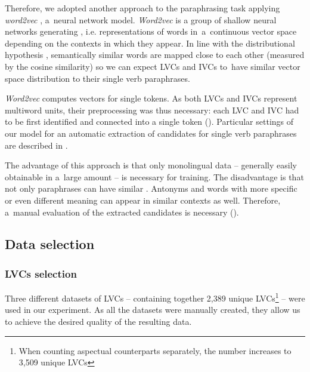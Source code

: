 \documentclass[output=paper,modfonts,nonflat]{langsci/langscibook}
\begin{document}

Therefore, we adopted another approach to the paraphrasing task applying 
\emph{word2vec} \citep{mikolov2013}, a~neural network model. \emph{Word2vec} 
is a group of shallow neural networks generating , i.e. 
representations  of words in~a~continuous vector space depending on the 
contexts in which they appear. In line with the distributional hypothesis 
\citep{harris54}, semantically similar words are mapped close to each other 
(measured by the  cosine similarity) so we can expect LVCs and IVCs to~have 
similar vector space distribution to their single verb paraphrases. 

\emph{Word2vec} computes vectors for single tokens. As both LVCs and IVCs 
represent multiword units, their preprocessing was thus necessary: each LVC 
and IVC had to be first identified and connected into a single token 
(). Particular settings of our model for an automatic 
extraction of candidates for single verb paraphrases are described in 
.

The advantage of this approach is that only monolingual data -- generally 
easily obtainable in a~large amount -- is necessary for  
training. The disadvantage is that not only paraphrases can have similar 
. Antonyms and words with more specific or even different meaning 
can appear in similar contexts as well. Therefore, a~manual evaluation of the 
extracted candidates is necessary ().

\subsection{Data selection}
\label{sec:datasets}

\subsubsection{LVCs selection}
\label{sect:lvc-selection}

Three different datasets of LVCs -- containing together 2,389 unique LVCs\footnote{When counting aspectual counterparts separately, the number increases to 3,509 
unique LVCs} -- were used in our experiment. As all the datasets were 
manually created, they allow us to achieve the desired quality of the resulting 
data. 
\end{document}
